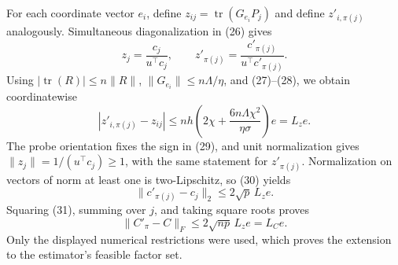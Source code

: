 For each coordinate vector \(e_i\), define \(z_{ij}=\operatorname{tr}(G_{e_i}P_j)\) and define \(z'_{i,\pi(j)}\) analogously. Simultaneous diagonalization in (26) gives
\[
 z_j=\frac{c_j}{u^\top c_j},
 \qquad
 z'_{\pi(j)}=\frac{c'_{\pi(j)}}{u^\top c'_{\pi(j)}}. \tag{29}
\]
Using \(|\operatorname{tr}(R)|\le n\lVert R\rVert\), \(\lVert G_{e_i}\rVert\le n\Lambda/\eta\), and (27)--(28), we obtain coordinatewise
\[
 |z'_{i,\pi(j)}-z_{ij}|
 \le nh\left(2\chi+\frac{6n\Lambda\chi^2}{\eta\sigma}\right)e
 =L_ze. \tag{30}
\]
The probe orientation fixes the sign in (29), and unit normalization gives \(\lVert z_j\rVert=1/(u^\top c_j)\ge1\), with the same statement for \(z'_{\pi(j)}\). Normalization on vectors of norm at least one is two-Lipschitz, so (30) yields
\[
 \lVert c'_{\pi(j)}-c_j\rVert_2
 \le2\sqrt p\,L_ze. \tag{31}
\]
Squaring (31), summing over \(j\), and taking square roots proves
\[
 \lVert C'_{\pi}-C\rVert_F
 \le2\sqrt{np}\,L_ze=L_Ce.
\]
Only the displayed numerical restrictions were used, which proves the extension to the estimator's feasible factor set.